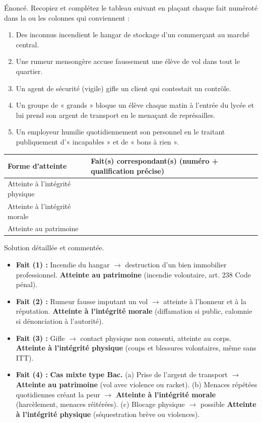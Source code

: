 \documentclass[11pt]{article}
\newcommand{\cle}[1]{{\popxbold\color{popdark}#1}}
\begin{document}
\begin{exoresolu}
Énoncé. Recopiez et complétez le tableau suivant en plaçant chaque fait numéroté dans la ou les colonnes qui conviennent :
\begin{enumerate}
\item Des inconnus incendient le hangar de stockage d'un commerçant au marché central.
\item Une rumeur mensongère accuse faussement une élève de vol dans tout le quartier.
\item Un agent de sécurité (vigile) gifle un client qui contestait un contrôle.
\item Un groupe de « grands » bloque un élève chaque matin à l'entrée du lycée et lui prend son argent de transport en le menaçant de représailles.
\item Un employeur humilie quotidiennement son personnel en le traitant publiquement d'« incapables » et de « bons à rien ».
\end{enumerate}
\begin{center}
\begin{tabularx}{\linewidth}{|l|X|}\hline
\rowcolor{popblueL} \textbf{Forme d'atteinte} & \textbf{Fait(s) correspondant(s) (numéro + qualification précise)} \\ \hline
Atteinte à l'intégrité physique & \\ \hline
Atteinte à l'intégrité morale & \\ \hline
Atteinte au patrimoine & \\ \hline
\end{tabularx}
\end{center}
\tcblower
Solution détaillée et commentée.
\begin{itemize}
\item \textbf{Fait (1) :} Incendie du hangar $\rightarrow$ destruction d'un bien immobilier professionnel. \textbf{Atteinte au patrimoine} (incendie volontaire, art. 238 Code pénal).
\item \textbf{Fait (2) :} Rumeur fausse imputant un vol $\rightarrow$ atteinte à l'honneur et à la réputation. \textbf{Atteinte à l'intégrité morale} (\cle{diffamation} si public, \cle{calomnie} si dénonciation à l'autorité).
\item \textbf{Fait (3) :} Gifle $\rightarrow$ contact physique non consenti, atteinte au corps. \textbf{Atteinte à l'intégrité physique} (\cle{coups et blessures volontaires}, même sans ITT).
\item \textbf{Fait (4) :} \textbf{Cas mixte type Bac.} (a) Prise de l'argent de transport $\rightarrow$ \textbf{Atteinte au patrimoine} (\cle{vol} avec violence ou \cle{racket}). (b) Menaces répétées quotidiennes créant la peur $\rightarrow$ \textbf{Atteinte à l'intégrité morale} (\cle{harcèlement}, \cle{menaces} réitérées). (c) Blocage physique $\rightarrow$ possible \textbf{Atteinte à l'intégrité physique} (\cle{séquestration} brève ou violences).

\end{itemize}
\end{exoresolu}
\end{document}
